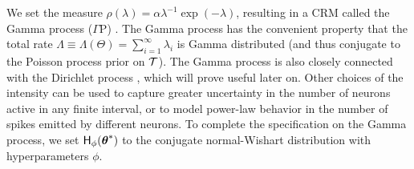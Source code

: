 We set the \Levy measure $\rho(\lambda) = \alpha \lambda^{-1}\exp(-\lambda)$,
resulting in a CRM called the Gamma process ($\Gamma$P) \citep{applebaum2004}. 
The Gamma process has the convenient property that the 
total rate $\Lambda \equiv \mathsf{\Lambda}(\Theta) = \sum_{i=1}^{\infty} \lambda_i$ is Gamma distributed (and thus conjugate to the Poisson process prior on $\mathcal{T}$).
The Gamma process is also closely connected with the Dirichlet process \citep{Ferguson73}, which will prove useful
later on.
Other choices of the \Levy intensity can be used to capture greater uncertainty in the number of neurons active in any finite interval, or to model
power-law behavior in the number of spikes emitted by different neurons.
% 
To complete the specification on the Gamma process, %
we set $\mathsf{H}_{\phi}(\boldsymbol{\theta}^*)$ 
to the conjugate normal-Wishart distribution with hyperparameters $\phi$.

